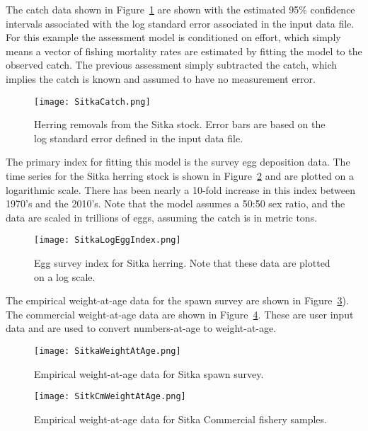 \documentclass[12pt,letterpaper]{article}
\begin{document}
  The catch data shown in Figure~\ref{fig:SitkaCatch} are shown with the estimated 95\% confidence intervals associated with the log standard error associated in the input data file.  For this example the assessment model is conditioned on effort, which simply means a vector of fishing mortality rates are estimated by fitting the model to the observed catch.  The previous assessment simply subtracted the catch, which implies the catch is known and assumed to have no measurement error. 



  \begin{figure}[tb]
    \centering
    \texttt{[image: SitkaCatch.png]}
    \caption{Herring removals from the Sitka stock. Error bars are based on the log standard error defined in the input data file.}
    \label{fig:SitkaCatch}
  \end{figure}

  The primary index for fitting this model is the survey egg deposition data. The time series for the Sitka herring stock is shown in Figure~\ref{fig:SitkaEggIndex} and are plotted on a logarithmic scale.  There has been nearly a 10-fold increase in this index between 1970's and the 2010's.  Note that the model assumes a 50:50 sex ratio, and the data are scaled in trillions of eggs, assuming the catch is in metric tons.


  \begin{figure}[tb]
    \centering
    \texttt{[image: SitkaLogEggIndex.png]}
    \caption{Egg survey index for Sitka herring. Note that these data are plotted on a log scale.}
    \label{fig:SitkaEggIndex}
  \end{figure}


  The empirical weight-at-age data for the spawn survey are shown in Figure~\ref{fig:SitkaWeightAtAge}).  The commercial weight-at-age data are shown in Figure~\ref{fig:SitkCmWeighAtAge}. These are user input data and are used to convert numbers-at-age to weight-at-age.

  \begin{figure}[tb]
    \centering
    \texttt{[image: SitkaWeightAtAge.png]}
    \caption{Empirical weight-at-age data for Sitka spawn survey.}
    \label{fig:SitkaWeightAtAge}
  \end{figure}

  \begin{figure}[tb]
    \centering
    \texttt{[image: SitkCmWeightAtAge.png]}
    \caption{Empirical weight-at-age data for Sitka Commercial fishery samples.}
    \label{fig:SitkCmWeighAtAge}
  \end{figure}
\end{document}
